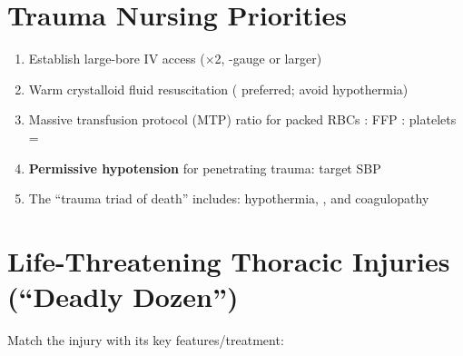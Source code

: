 \documentclass[11pt]{article}
\begin{document}
\hrulefill

\section{Trauma Nursing Priorities}

\begin{enumerate}
    \item Establish large-bore IV access ($\times$2, \underline{\hspace{2cm}}-gauge or larger)
    
    \item Warm crystalloid fluid resuscitation (\underline{\hspace{2cm}} preferred; avoid hypothermia)
    
    \item Massive transfusion protocol (MTP) ratio for packed RBCs : FFP : platelets = \underline{\hspace{2cm}}
    
    \item \textbf{Permissive hypotension} for penetrating trauma: target SBP \underline{\hspace{2cm}}
    
    \item The ``trauma triad of death'' includes: hypothermia, \underline{\hspace{2cm}}, and coagulopathy
\end{enumerate}

\hrulefill

\section{Life-Threatening Thoracic Injuries (``Deadly Dozen'')}

Match the injury with its key features/treatment:
\end{document}
